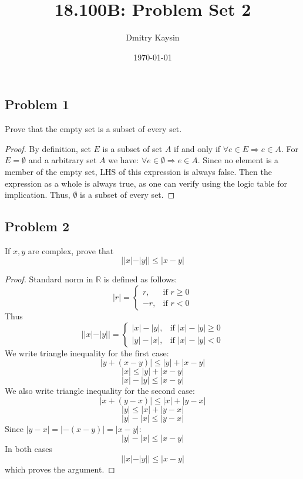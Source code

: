 \documentclass{article}
\title{18.100B: Problem Set 2}
\author{Dmitry Kaysin}
\date\today
\begin{document}
\maketitle 

\subsection*{Problem 1}

\begin{tcolorbox}
Prove that the empty set is a subset of every set.
\end{tcolorbox}

\begin{proof}
By definition, set $E$ is a subset of set $A$ if and only if $\forall e \in E \Rightarrow e \in A$. For $E = \emptyset$ and a arbitrary set $A$ we have: $\forall e \in \emptyset \Rightarrow e \in A$. Since no element is a member of the empty set, LHS of this expression is always false. Then the expression as a whole is always true, as one can verify using the logic table for implication. Thus, $\emptyset$ is a subset of every set.

\end{proof}

\subsection*{Problem 2}

\begin{tcolorbox}
If $x, y$ are complex, prove that
$$||x| - |y|| \leq |x - y|$$
\end{tcolorbox}

\begin{proof}
Standard norm in $\mathbb{R}$ is defined as follows:
$$|r| = 
\begin{cases}
r, & \text{if } r \geq 0 \\
-r, & \text{if } r < 0
\end{cases}
$$
Thus
$$||x|-|y|| = 
\begin{cases}
|x|-|y|, & \text{if } |x|-|y| \geq 0 \\
|y|-|x|, & \text{if } |x|-|y| < 0
\end{cases}
$$
We write triangle inequality for the first case:
$$ |y+(x-y)| \leq |y|+|x-y|$$
$$ |x| \leq |y|+|x-y|$$
$$ |x| - |y| \leq |x-y|$$
We also write triangle inequality for the second case:
$$ |x+(y-x)| \leq |x|+|y-x|$$
$$ |y| \leq |x|+|y-x|$$
$$ |y| - |x| \leq |y-x|$$
Since $|y - x| = |-(x - y)| = |x - y|$:
$$ |y| - |x| \leq |x-y|$$
In both cases
$$||x|-|y|| \leq |x-y|$$
which proves the argument.
\end{proof}
\end{document}
